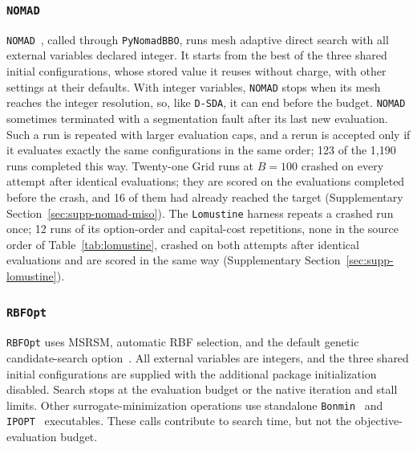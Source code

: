 \documentclass{article}
\newcommand{\david}[1]{\textcolor{red}{D: #1}}
\begin{document}
\subsubsection{\texttt{NOMAD}}
\label{sec:nomad-settings}
\texttt{NOMAD}~\citep{audet2022nomad}, called through \texttt{PyNomadBBO}, runs mesh adaptive direct search with all external variables declared integer.
It starts from the best of the three shared initial configurations, whose stored value it reuses without charge, with other settings at their defaults.
With integer variables, \texttt{NOMAD} stops when its mesh reaches the integer resolution, so, like \texttt{D-SDA}, it can end before the budget.
\texttt{NOMAD} sometimes terminated with a segmentation fault after its last new evaluation.
Such a run is repeated with larger evaluation caps, and a rerun is accepted only if it evaluates exactly the same configurations in the same order; 123 of the 1,190 runs completed this way.
Twenty-one Grid runs at \(B=100\) crashed on every attempt after identical evaluations; they are scored on the evaluations completed before the crash, and 16 of them had already reached the target (Supplementary Section~\ref{sec:supp-nomad-miso}).
The \texttt{Lomustine} harness repeats a crashed run once; 12 runs of its option-order and capital-cost repetitions, none in the source order of Table~\ref{tab:lomustine}, crashed on both attempts after identical evaluations and are scored in the same way (Supplementary Section~\ref{sec:supp-lomustine}).

\subsubsection{\texttt{RBFOpt}}
\texttt{RBFOpt} uses MSRSM, automatic RBF selection, and the default genetic candidate-search option~\citep{costa2018rbfopt,nannicini2021implementation}.
All external variables are integers, and the three shared initial configurations are supplied with the additional package initialization disabled.
Search stops at the evaluation budget or the native iteration and stall limits.
Other surrogate-minimization operations use standalone \texttt{Bonmin}~\citep{bonami2008algorithmic} and \texttt{IPOPT}~\citep{wachter2006implementation} executables.
These calls contribute to search time, but not the objective-evaluation budget.
\end{document}

